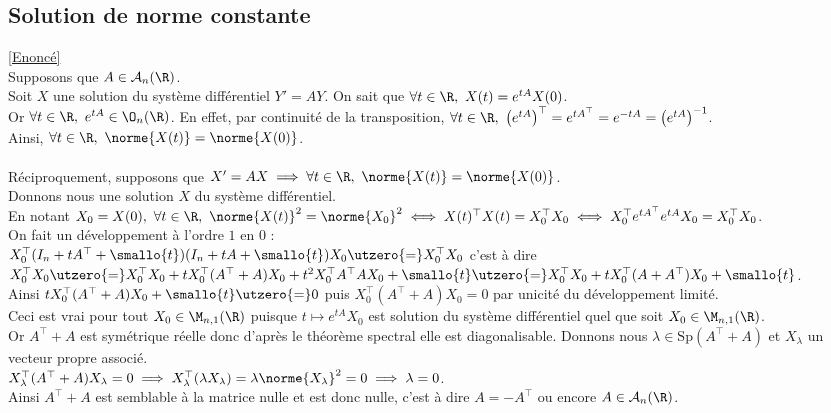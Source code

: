 \documentclass{book}
\begin{document}
	\subsection{Solution de norme constante }
	\label{Solution de norme constante corrigé}
	\textcolor{blue}{\hyperref[Solution de norme constante]{[Enoncé]}}\\
	Supposons que $A\in \mathcal A_n(\R)$.\\
	Soit $X$ une solution du système différentiel $Y'=AY$. On sait que $\forall t\in \R,\ X(t)=e^{tA}X(0)$.\\
	Or $\forall t\in \R,\ e^{tA}\in \O_n(\R)$. En effet, par continuité de la transposition, $\forall t\in \R,\ \left(e^{tA}\right)^\top=e^{tA^\top}=e^{-tA}=\left(e^{tA}\right)^{-1}$.\\
	Ainsi, $\forall t\in \R,\ \norme{X(t)}=\norme{X(0)}$.\\\\
	Réciproquement, supposons que $X'=AX\implies \forall t\in \R,\ \norme{X(t)}=\norme{X(0)}$.\\
	Donnons nous une solution $X$ du système différentiel.\\
	En notant $X_0=X(0),\ \forall t\in \R,\ \norme{X(t)}^2=\norme{X_0}^2\iff X(t)^\top X(t)=X_0^\top X_0\iff X_0^\top e^{tA^\top}e^{tA}X_0=X_0^\top X_0$.\\
	On fait un développement à l'ordre $1$ en $0$ :\\
	$X_0^\top(I_n+tA^\top+\smallo{t})(I_n+tA+\smallo{t})X_0\utzero{=}X_0^\top X_0$ c'est à dire $X_0^\top X_0\utzero{=}X_0^\top X_0+tX_0^\top(A^\top+A)X_0+t^2X_0^\top A^\top AX_0+\smallo{t}\utzero{=}X_0^\top X_0+tX_0^\top(A+A^\top)X_0+\smallo{t}$.\\
	Ainsi $tX_0^\top(A^\top+A)X_0+\smallo{t}\utzero{=}0$ puis $X_0^\top(A^\top+A)X_0=0$ par unicité du développement limité.\\
	Ceci est vrai pour tout $X_0\in \M_{n,1}(\R)$ puisque $t\mapsto e^{tA}X_0$ est solution du système différentiel quel que soit $X_0\in \M_{n,1}(\R)$.\\
	Or $A^\top+A$ est symétrique réelle donc d'après le théorème spectral elle est diagonalisable. Donnons nous $\lambda\in \text{Sp}(A^\top+A)$ et $X_\lambda$ un vecteur propre associé.\\
	$X_\lambda^\top(A^\top+A)X_\lambda=0\implies X_\lambda^\top(\lambda X_\lambda)=\lambda\norme{X_\lambda}^2=0\implies \lambda=0$.\\
	Ainsi $A^\top+A$ est semblable à la matrice nulle et est donc nulle, c'est à dire $A=-A^\top$ ou encore $A\in \mathcal A_n(\R)$.
	
\end{document}
